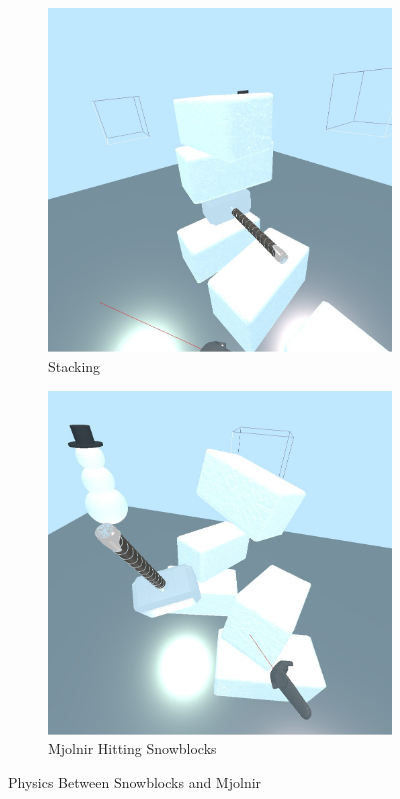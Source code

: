 \documentclass[conference,12pt]{IEEEtran}
\begin{document}
\begin{figure}[H]
    \begin{subfigure}{\linewidth}
        \centering
        \includegraphics[width=0.75\linewidth]{screenshots/physics_a.jpg}
        \caption{Stacking}
    \end{subfigure}
    \begin{subfigure}{\linewidth}
        \centering
        \includegraphics[width=0.75\linewidth]{screenshots/physics_b.jpg}
        \caption{Mjolnir Hitting Snowblocks}
    \end{subfigure}
    \caption{Physics Between Snowblocks and Mjolnir}
    \label{fig:physics}
\end{figure}
\end{document}
